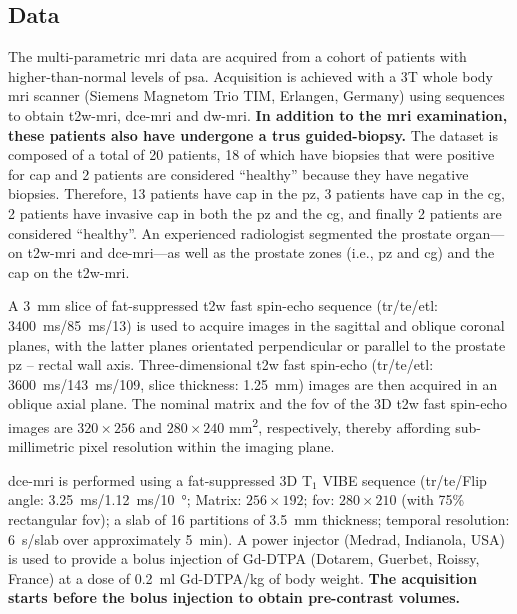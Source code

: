 \documentclass[num-refs]{wiley-article}
\begin{document}
\subsection{Data}\label{sec:data}

The multi-parametric \ac{mri} data are acquired from a cohort of patients with higher-than-normal levels of \ac{psa}.
Acquisition is achieved with a 3T whole body \ac{mri} scanner (Siemens Magnetom Trio TIM, Erlangen, Germany) using sequences to obtain \ac{t2w}-\ac{mri}, \ac{dce}-\ac{mri} and \ac{dw}-\ac{mri}.
\textbf{In addition to the \ac{mri} examination, these patients also have
undergone a \ac{trus} guided-biopsy.}
The dataset is composed of a total of 20 patients, 18 of which have
biopsies that were positive for \ac{cap} and 2 patients are considered
``healthy'' because they have negative biopsies.
Therefore, 13 patients have \ac{cap} in the \ac{pz}, 3 patients have
\ac{cap} in the \ac{cg}, 2 patients have invasive \ac{cap} in both the
\ac{pz} and the \ac{cg}, and finally 2 patients are considered ``healthy''.
An experienced radiologist segmented the prostate organ---on
\ac{t2w}-\ac{mri} and \ac{dce}-\ac{mri}---as well as the prostate
zones (i.e., \ac{pz} and \ac{cg}) and the \ac{cap} on the \ac{t2w}-\ac{mri}.

A \SI{3}{\mm} slice of fat-suppressed \ac{t2w} fast spin-echo sequence
(\ac{tr}/\ac{te}/\ac{etl}: \SI{3400}{\ms}/\SI{85}{\ms}/13) is used to
acquire images in the sagittal and oblique coronal planes, with the latter planes orientated perpendicular or parallel to the prostate \ac{pz} – rectal wall axis.
Three-dimensional \ac{t2w} fast spin-echo (\ac{tr}/\ac{te}/\ac{etl}: \SI{3600}{\ms}/\SI{143}{\ms}/109, slice thickness: \SI{1.25}{\mm}) images are then acquired in an oblique axial plane.
The nominal matrix and the \ac{fov} of the 3D \ac{t2w} fast spin-echo images are $320 \times 256$ and $280 \times 240$ mm\textsuperscript{2}, respectively, thereby affording sub-millimetric pixel resolution within the imaging plane.

\ac{dce}-\ac{mri} is performed using a fat-suppressed 3D T$_1$ VIBE
sequence (\ac{tr}/\ac{te}/Flip angle:
\SI{3.25}{\ms}/\SI{1.12}{\ms}/\SI{10}{\degree}; Matrix: $256 \times
192$; \ac{fov}: $280 \times 210$ (with 75\% rectangular \ac{fov}); a slab of 16 partitions of \SI{3.5}{\mm} thickness; temporal resolution: \SI{6}{\s}/slab over approximately \SI{5}{\minute}).
A power injector (Medrad, Indianola, USA) is used to provide a bolus
injection of Gd-DTPA (Dotarem, Guerbet, Roissy, France) at a dose of
\SI{0.2}{\ml} Gd-DTPA/kg of body weight.
\textbf{The acquisition starts before the bolus injection to obtain
  pre-contrast volumes.}
\end{document}
